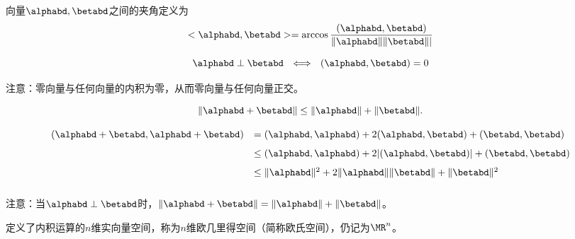 \begin{frame}
  
  \begin{dingyi}[向量之间的夹角]
    向量$\alphabd,\betabd$之间的夹角定义为
    $$
    <\alphabd,\betabd>=\arccos\frac{(\alphabd,\betabd)}{\|\alphabd\|\|\betabd\||}
    $$
  \end{dingyi}
  \pause
  \begin{dingli}
    $$\alphabd\perp\betabd ~~\Longleftrightarrow~~
    (\alphabd,\betabd)=0
    $$
  \end{dingli}
  \pause
  注意：零向量与任何向量的内积为零，从而零向量与任何向量正交。
  
\end{frame}



\begin{frame}
  
  \begin{dingli}[三角不等式]
    $$
    \|\alphabd+\betabd\|\le\|\alphabd\|+\|\betabd\|.
    $$
  \end{dingli}
  \pause\proofname
  $$
  \begin{array}{rl}
    (\alphabd+\betabd,\alphabd+\betabd)
    &= (\alphabd,\alphabd)+2(\alphabd,\betabd)+(\betabd,\betabd)\\[0.1in]
    &\le (\alphabd,\alphabd)+2|(\alphabd,\betabd)|+(\betabd,\betabd) \\[0.1in]
    &\le \|\alphabd\|^2+2\|\alphabd\|\|\betabd\|+\|\betabd\|^2 \\[0.1in]
  \end{array}
  $$
  
  \pause
  注意：当$\alphabd\perp\betabd$时，$\|\alphabd+\betabd\|=\|\alphabd\|+\|\betabd\|$。
  
\end{frame}


\begin{frame}
  
  \begin{dingyi}[欧几里得空间]
    定义了内积运算的$n$维实向量空间，称为$n$维欧几里得空间（简称欧氏空间），仍记为$\MR^n$。
  \end{dingyi}
  
\end{frame}
